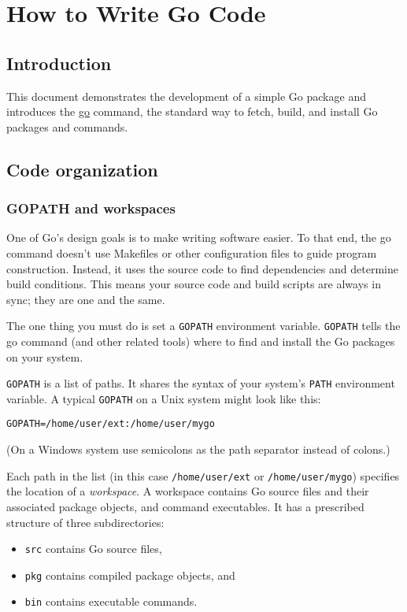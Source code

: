 \chapter*{How to Write Go Code}
\section *{Introduction}
This document demonstrates the development of a simple Go package
and introduces the \href{http://golang.org/cmd/go/}{go} command,
the standard way to fetch, build, and install Go packages and
commands.

\section*{Code organization}
\subsection*{GOPATH and workspaces}

One of Go's design goals is to make writing software easier. To
that end, the go command doesn't use Makefiles or other configuration
files to guide program construction. Instead, it uses the source
code to find dependencies and determine build conditions. This means
your source code and build scripts are always in sync; they are one
and the same.

The one thing you must do is set a \verb|GOPATH| environment variable.
\verb|GOPATH| tells the go command (and other related tools) where to find
and install the Go packages on your system.

\verb|GOPATH| is a list of paths. It shares the syntax of your
system's \verb|PATH| environment variable. A typical \verb|GOPATH|
on a Unix system might look like this:

\begin{Verbatim}[frame=single]
GOPATH=/home/user/ext:/home/user/mygo
\end{Verbatim}

(On a Windows system use semicolons as the path separator instead of colons.)

Each path in the list (in this case \verb|/home/user/ext| or
\verb|/home/user/mygo|) specifies the location of a \textit{workspace}.
A workspace contains Go source files and their associated package
objects, and command executables. It has a prescribed structure of
three subdirectories:

\begin{itemize}
  \item \verb|src| contains Go source files,
  \item \verb|pkg| contains compiled package objects, and
  \item \verb|bin| contains executable commands.
\end{itemize}

